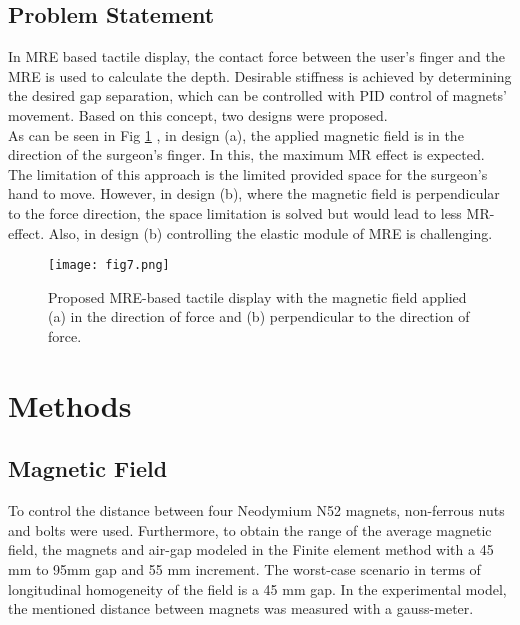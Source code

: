 \documentclass[conference]{IEEEtran}
\begin{document}
\subsection{Problem Statement}
In MRE based tactile display, the contact force between the user's finger and the MRE is used to calculate the depth. Desirable stiffness is achieved by determining the desired gap separation, which can be controlled with PID control of magnets' movement. Based on this concept, two designs were proposed.\\
As can be seen in Fig \ref{fig7} , in design (a), the applied magnetic field is in the direction of the surgeon's finger. In this, the maximum MR effect is expected. The limitation of this approach is the limited provided space for the surgeon's hand to move.  However, in design (b), where the magnetic field is perpendicular to the force direction, the space limitation is solved but would lead to less MR-effect. Also, in design (b) controlling the elastic module of MRE is challenging. 
\begin{figure}[b]
	\centerline{\texttt{[image: fig7.png]}}
	\caption{Proposed MRE-based tactile display with the magnetic field applied (a) in the direction of force and (b) perpendicular to the direction of force.}
	\label{fig7}
\end{figure}
\section{Methods}
\subsection{Magnetic Field}
To control the distance between four Neodymium N52 magnets, non-ferrous nuts and bolts were used. Furthermore, to obtain the range of the average magnetic field, the magnets and air-gap modeled in the Finite element method with a 45 mm to 95mm gap and 55 mm increment. The worst-case scenario in terms of longitudinal homogeneity of the field is a 45 mm gap. In the experimental model, the mentioned distance between magnets was measured with a gauss-meter.
\end{document}
